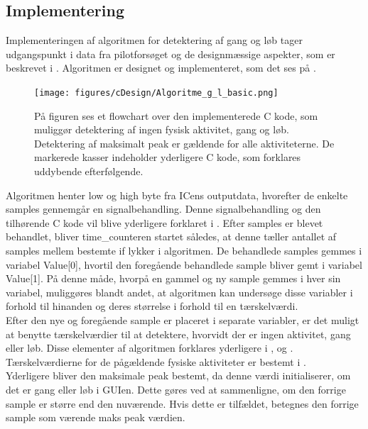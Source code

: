 \subsection{Implementering}
Implementeringen af algoritmen for detektering af gang og løb tager udgangspunkt i data fra pilotforsøget og de designmæssige aspekter, som er beskrevet i . Algoritmen er designet og implementeret, som det ses på .
\begin{figure}[H]
	\centering
	\texttt{[image: figures/cDesign/Algoritme\_g\_l\_basic.png]}
	\caption{På figuren ses et flowchart over den implementerede C kode, som muliggør detektering af ingen fysisk aktivitet, gang og løb. Detektering af maksimalt peak er gældende for alle aktiviteterne. De markerede kasser indeholder yderligere C kode, som forklares uddybende efterfølgende.}
	\label{fig:basic_algo_g_l}
\end{figure} \vspace{-0.5cm}
Algoritmen henter low og high byte fra ICens outputdata, hvorefter de enkelte samples gennemgår en signalbehandling. Denne signalbehandling og den tilhørende C kode vil blive yderligere forklaret i . Efter samples er blevet behandlet, bliver time\_counteren startet således, at denne tæller antallet af samples mellem bestemte if lykker i algoritmen. De behandlede samples gemmes i variabel Value[0], hvortil den foregående behandlede sample bliver gemt i variabel Value[1]. På denne måde, hvorpå en gammel og ny sample gemmes i hver sin variabel, muliggøres blandt andet, at algoritmen kan undersøge disse variabler i forhold til hinanden og deres størrelse i forhold til en tærskelværdi. \\
Efter den nye og foregående sample er placeret i separate variabler, er det muligt at benytte tærskelværdier til at detektere, hvorvidt der er ingen aktivitet, gang eller løb. Disse elementer af algoritmen forklares yderligere i ,  og . Tærskelværdierne for de pågældende fysiske aktiviteter er bestemt i . \\ 
Yderligere bliver den maksimale peak bestemt, da denne værdi initialiserer, om det er gang eller løb i GUIen. Dette gøres ved at sammenligne, om den forrige sample er større end den nuværende. Hvis dette er tilfældet, betegnes den forrige sample som værende maks peak værdien. %

